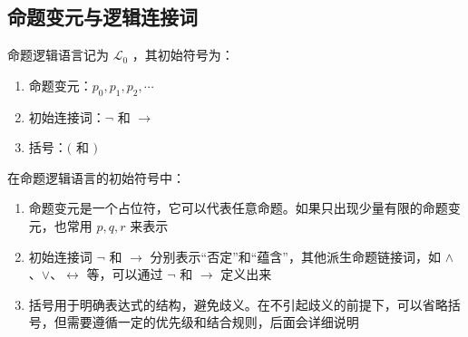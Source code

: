 \subsection{命题变元与逻辑连接词}
\label{variables_and_connectives}

\begin{definition}[命题逻辑语言的初始符号]
    \label{initial_symbols_of_L0}
    命题逻辑语言记为 $\mathcal{L}_0$ ，其初始符号为：
    \begin{enumerate}
        \item 命题变元：$p_0,p_1,p_2,\cdots$
        \item 初始连接词：$\neg$ 和 $\to$
        \item 括号：$($ 和 $)$
    \end{enumerate}
\end{definition}

\begin{remark}
    在命题逻辑语言的初始符号中：
    \begin{enumerate}
        \item 命题变元是一个占位符，它可以代表任意命题。如果只出现少量有限的命题变元，也常用 $p,q,r$ 来表示
        \item 初始连接词 $\neg$ 和 $\to$ 分别表示“否定”和“蕴含”，其他派生命题链接词，如 $\wedge$、$\vee$、$\leftrightarrow$ 等，可以通过 $\neg$ 和 $\to$ 定义出来
        \item 括号用于明确表达式的结构，避免歧义。在不引起歧义的前提下，可以省略括号，但需要遵循一定的优先级和结合规则，后面会详细说明
    \end{enumerate}
\end{remark}
